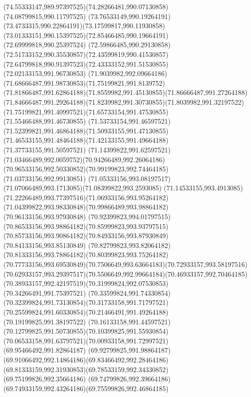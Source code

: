 {    \curveto(74.55333147,989.97397525)(74.28266481,990.07130858)(74.08799815,990.11797525)
    \curveto(73.76533149,990.19264191)(73.4733315,990.22864191)(73.17599817,990.11930858)
    \curveto(73.01333151,990.15397525)(72.85466485,990.19664191)(72.69999818,990.25397524)
    \curveto(72.59866485,990.29130858)(72.51733152,990.35530857)(72.43599819,990.41530857)
    \curveto(72.64799818,990.91397523)(72.43333152,991.51530855)(72.02133153,991.96730853)
    \curveto(71.9039982,992.09664186)(71.68666487,991.98730853)(71.75199821,991.8139752)
    \curveto(71.81866487,991.62864188)(71.8559982,991.45130855)(71.86666487,991.27264188)
    \curveto(71.84666487,991.29264188)(71.8239982,991.30730855)(71.8039982,991.32197522)
    \curveto(71.75199821,991.40997521)(71.65733154,991.47530855)(71.55466488,991.46730855)
    \curveto(71.53733154,991.46597521)(71.52399821,991.46864188)(71.50933155,991.47130855)
    \curveto(71.46533155,991.48464188)(71.42133155,991.49664188)(71.37733155,991.50597521)
    \curveto(71.14399822,991.62597521)(71.03466489,992.0059752)(70.94266489,992.26064186)
    \curveto(70.96533156,992.50330852)(70.99199823,992.74464185)(71.03733156,992.99130851)
    \curveto(71.05333156,993.08197517)(71.07066489,993.1713085)(71.08399822,993.2593085)
    \curveto(71.14533155,993.4913085)(71.22266489,993.77397516)(71.06933156,993.95264182)
    \curveto(71.04399822,993.98330848)(70.99866489,993.98864182)(70.96133156,993.97930848)
    \curveto(70.92399823,994.01797515)(70.86533156,993.98864182)(70.85999823,993.93797515)
    \curveto(70.85733156,993.90864182)(70.84933156,993.87930849)(70.84133156,993.85130849)
    \curveto(70.82799823,993.82064182)(70.81333156,993.78864182)(70.80399823,993.75264182)
    \curveto(70.77733156,993.69530849)(70.7506649,993.63664183)(70.72933157,993.58197516)
    \curveto(70.62933157,993.29397517)(70.5506649,992.99664184)(70.46933157,992.70464185)
    \curveto(70.38933157,992.42197519)(70.31999824,992.07530853)(70.34266491,991.75397521)
    \curveto(70.33599824,991.74330854)(70.32399824,991.73130854)(70.31733158,991.71797521)
    \curveto(70.25599824,991.60330854)(70.21466491,991.49264188)(70.19199825,991.38197522)
    \curveto(70.16133158,991.44597521)(70.12799825,991.50730855)(70.10399825,991.55930854)
    \curveto(70.06533158,991.63797521)(70.00933158,991.72997521)(69.95466492,991.82864187)
    \curveto(69.92799825,991.98864187)(69.91066492,992.14864186)(69.83466492,992.28464186)
    \curveto(69.81333159,992.31930853)(69.78533159,992.34330852)(69.75199826,992.35664186)
    \curveto(69.74799826,992.39664186)(69.74933159,992.43264186)(69.75599826,992.46864185)
}
